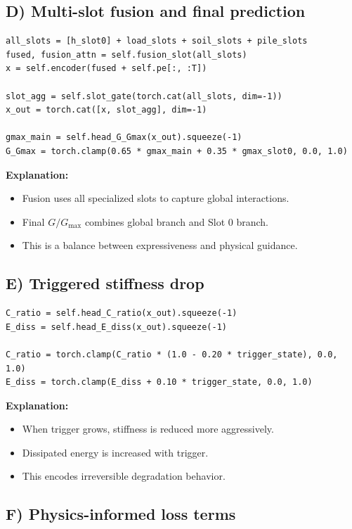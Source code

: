 \documentclass[12pt,a4paper]{article}
\begin{document}
\subsection{D) Multi-slot fusion and final prediction}

\begin{lstlisting}[caption=Fusion + final G/Gmax]
all_slots = [h_slot0] + load_slots + soil_slots + pile_slots
fused, fusion_attn = self.fusion_slot(all_slots)
x = self.encoder(fused + self.pe[:, :T])

slot_agg = self.slot_gate(torch.cat(all_slots, dim=-1))
x_out = torch.cat([x, slot_agg], dim=-1)

gmax_main = self.head_G_Gmax(x_out).squeeze(-1)
G_Gmax = torch.clamp(0.65 * gmax_main + 0.35 * gmax_slot0, 0.0, 1.0)
\end{lstlisting}

\textbf{Explanation:}
\begin{itemize}
  \item Fusion uses all specialized slots to capture global interactions.
  \item Final $G/G_{\max}$ combines global branch and Slot 0 branch.
  \item This is a balance between expressiveness and physical guidance.
\end{itemize}

\subsection{E) Triggered stiffness drop}

\begin{lstlisting}[caption=Post-processing with trigger]
C_ratio = self.head_C_ratio(x_out).squeeze(-1)
E_diss = self.head_E_diss(x_out).squeeze(-1)

C_ratio = torch.clamp(C_ratio * (1.0 - 0.20 * trigger_state), 0.0, 1.0)
E_diss = torch.clamp(E_diss + 0.10 * trigger_state, 0.0, 1.0)
\end{lstlisting}

\textbf{Explanation:}
\begin{itemize}
  \item When trigger grows, stiffness is reduced more aggressively.
  \item Dissipated energy is increased with trigger.
  \item This encodes irreversible degradation behavior.
\end{itemize}

\subsection{F) Physics-informed loss terms}
\end{document}
